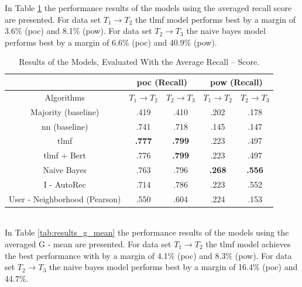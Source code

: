 \noindent In Table \ref{tab:results_recall_mean} the performance results of the models using the averaged recall score are presented. For data set $T_1 \to T_2$ the \acrshort{tlmf} model performs best by a margin of 3.6\% (\acrshort{poc}) and 8.1\% (\acrshort{pow}). For data set $T_2 \to T_3$ the naive bayes model performs best by a margin of 6.6\% (\acrshort{poc}) and 40.9\% (\acrshort{pow}).

\begin{table}[h!]
    \centering
    \begin{tabular}{|c|c|c|c|c|}
    \hline
     & \multicolumn{2}{|c|}{\acrshort{poc} (Recall)} & \multicolumn{2}{|c|}{\acrshort{pow} (Recall)} \\
     \hline
    Algorithms & $T_1 \to T_2$ & $T_2 \to T_3$ & $T_1 \to T_2$ & $T_2 \to T_3$\\
    \hline  Majority (baseline) & .419 & .410 & .202 & .178 \\ 
    \acrshort{nn} (baseline) & .741 & .718 & .145 & .147\\
    \acrshort{tlmf} & \textbf{.777} & \textbf{.799} & .223 & .497 \\
    \acrshort{tlmf} + Bert & .776 & \textbf{.799} & .223 & .497\\
    Naive Bayes & .763 & .796 & \textbf{.268} & \textbf{.556} \\
    I - AutoRec & .714 & .786 & .223 & .552\\
    User - Neighborhood (Pearson) & .550 & .604 & .224 & .153\\
    \hline
    \end{tabular}
    \caption{Results of the Models, Evaluated With the Average Recall – Score.}
    \label{tab:results_recall_mean}
\end{table}\\

\noindent In Table \ref{tab:results_g_mean} the performance results of the models using the averaged G - mean are presented. For data set $T_1 \to T_2$ the \acrshort{tlmf} model achieves the best performance with by a margin of 4.1\% (\acrshort{poc}) and 8.3\% (\acrshort{pow}). For data set $T_2 \to T_3$ the naive bayes model performs best by a margin of 16.4\% (\acrshort{poc}) and 44.7\%. 


